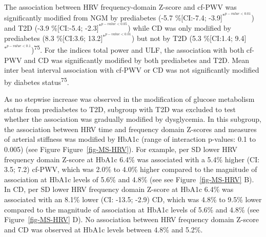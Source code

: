 \documentclass[
  letterpaper,
  headsepline=true,
  open=any]{scrbook}
\begin{document}
The association between HRV frequency-domain Z-score and cf-PWV was
significantly modified from NGM by prediabetes (-5.7 \%{[}CI:-7.4;
-3.9{]}\(^{*^{p-value< 0.01}}\)) and T2D (-3.9 \%{[}CI:-5.4;
-2.3{]}\(^{*^{p-value< 0.05}}\)) while CD was only modified by
prediabetes (8.3 \%{[}CI:3.6; 13.2{]}\(^{*^{p-value< 0.01}}\)) but not
by T2D (5.3 \%{[}CI:1.4;
9.4{]}\(^{*^{p-value< 0.1}}\))\textsuperscript{75}. For the indices
total power and ULF, the association with both cf-PWV and CD was
significantly modified by both prediabetes and T2D. Mean inter beat
interval association with cf-PWV or CD was not significantly modified by
diabetes status\textsuperscript{75}.

As no stepwise increase was observed in the modification of glucose
metabolism status from prediabetes to T2D, subgroup with T2D was
excluded to test whether the association was gradually modified by
dysglycemia. In this subgroup, the association between HRV time and
frequency domain Z-scores and measures of arterial stiffness was
modified by HbA1c (range of interaction p-values: 0.1 to 0.005) (see
Figure Figure~\ref{fig-MS-HRV}). For example, per SD lower HRV frequency
domain Z-score at HbA1c 6.4\% was associated with a 5.4\% higher (CI:
3.5; 7.2) cf-PWV, which was 2.0\% to 4.0\% higher compared to the
magnitude of association at HbA1c levels of 5.6\% and 4.8\% (see see
Figure~\ref{fig-MS-HRV} B). In CD, per SD lower HRV frequency domain
Z-score at HbA1c 6.4\% was associated with an 8.1\% lower (CI: -13.5;
-2.9) CD, which was 4.8\% to 9.5\% lower compared to the magnitude of
association at HbA1c levels of 5.6\% and 4.8\% (see
Figure~\ref{fig-MS-HRV} D). No association between HRV frequency domain
Z-score and CD was observed at HbA1c levels between 4.8\% and 5.2\%.

\end{document}
